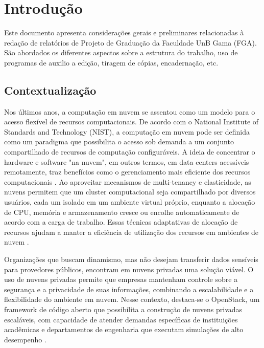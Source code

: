 \chapter*[Introdução]{Introdução}

Este documento apresenta considerações gerais e preliminares relacionadas 
à redação de relatórios de Projeto de Graduação da Faculdade UnB Gama 
(FGA). São abordados os diferentes aspectos sobre a estrutura do trabalho, 
uso de programas de auxilio a edição, tiragem de cópias, encadernação, etc.

\section{Contextualização}

Nos últimos anos, a computação em nuvem se assentou como um modelo para o acesso flexível de recursos computacionais. De acordo com o National Institute of Standards and Technology (NIST), a computação em nuvem pode ser definida como um paradigma que possibilita o acesso sob demanda a um conjunto compartilhado de recursos de computação configuráveis. A ideia de concentrar o hardware e software "na nuvem", em outros termos, em data centers acessíveis remotamente, traz benefícios como o gerenciamento mais eficiente dos recursos computacionais \cite{mell2011}. Ao aproveitar mecanismos de multi-tenancy e elasticidade, as nuvens permitem que um cluster computacional seja compartilhado por diversos usuários, cada um isolado em um ambiente virtual próprio, enquanto a alocação de CPU, memória e armazenamento cresce ou encolhe automaticamente de acordo com a carga de trabalho. Essas técnicas adaptativas de alocação de recursos ajudam a manter a eficiência de utilização dos recursos em ambientes de nuvem \cite{dai2015, ray2013}. 

Organizações que buscam dinamismo, mas não desejam transferir dados sensíveis para provedores públicos, encontram em nuvens privadas uma solução viável. O uso de nuvens privadas permite que empresas mantenham controle sobre a segurança e a privacidade de suas informações, combinando a escalabilidade e a flexibilidade do ambiente em nuvem. Nesse contexto, destaca-se o OpenStack, um framework de código aberto que possibilita a construção de nuvens privadas escaláveis, com capacidade de atender demandas específicas de instituições acadêmicas e departamentos de engenharia que executam simulações de alto desempenho \cite{heuchert2021}. 

